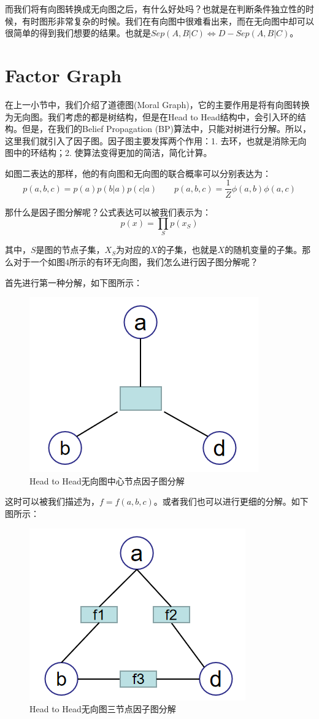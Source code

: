 \documentclass[a4paper]{article}
\begin{document}
而我们将有向图转换成无向图之后，有什么好处吗？也就是在判断条件独立性的时候，有时图形非常复杂的时候。我们在有向图中很难看出来，而在无向图中却可以很简单的得到我们想要的结果。也就是$Sep(A,B|C) \Longleftrightarrow D-Sep(A,B|C)$。

\section{Factor Graph}
在上一小节中，我们介绍了道德图(Moral Graph)，它的主要作用是将有向图转换为无向图。我们考虑的都是树结构，但是在Head to Head结构中，会引入环的结构。但是，在我们的Belief Propagation (BP)算法中，只能对树进行分解。所以，这里我们就引入了因子图。因子图主要发挥两个作用：1. 去环，也就是消除无向图中的环结构；2. 使算法变得更加的简洁，简化计算。

如图二表达的那样，他的有向图和无向图的联合概率可以分别表达为：
\begin{equation}
    p(a,b,c) = p(a)p(b|a)p(c|a) \qquad p(a,b,c) = \frac{1}{Z}\phi(a,b)\phi(a,c)
\end{equation}

那什么是因子图分解呢？公式表达可以被我们表示为：
\begin{equation}
    p(x) = \prod_{S}p(x_S)
\end{equation}

其中，$S$是图的节点子集，$X_S$为对应的$X$的子集，也就是$X$的随机变量的子集。那么对于一个如图4所示的有环无向图，我们怎么进行因子图分解呢？

首先进行第一种分解，如下图所示：
\begin{figure}[H]
    \centering
    \includegraphics[width=.35\textwidth]{微信图片_20191212093305.png}
    \caption{Head to Head无向图中心节点因子图分解}
    
\end{figure}

这时可以被我们描述为，$f = f(a,b,c)$。或者我们也可以进行更细的分解。如下图所示：
\begin{figure}[H]
    \centering
    \includegraphics[width=.35\textwidth]{微信图片_20191212094218.png}
    \caption{Head to Head无向图三节点因子图分解}
    
\end{figure}
\end{document}
